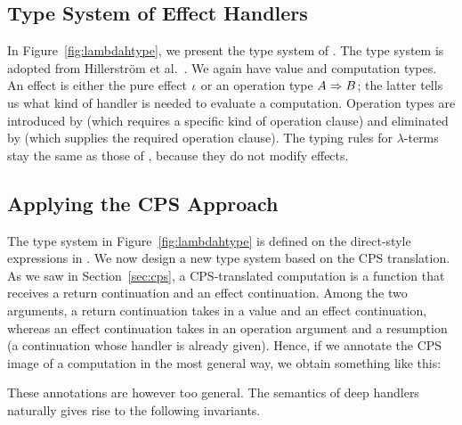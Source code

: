 \LambdaszType


\subsection{Type System of Effect Handlers}
\label{sec:type2:handler}

In Figure~\ref{fig:lambdahtype}, we present the type system of \lambdah.
The type system is adopted from Hillerstr\"om et al.~\cite{hillerstrom-cps}.
We again have value and computation types.
An effect is either the pure effect $\iota$ or an operation type
$A \Rightarrow B$; the latter tells us what kind of handler is needed to
evaluate a computation.
Operation types are introduced by  (which requires a specific
kind of operation clause) and eliminated by  (which supplies
the required operation clause).
The typing rules for $\lambda$-terms stay the same as those of \lambdasz,
because they do not modify effects.

\LambdahType


\subsection{Applying the CPS Approach}
\label{sec:type2:cps}

The type system in Figure~\ref{fig:lambdahtype} is defined on the 
direct-style expressions in \lambdah.
We now design a new type system based on the CPS translation.
As we saw in Section~\ref{sec:cps}, a CPS-translated \lambdah computation
is a function that receives a return continuation and an effect continuation.
Among the two arguments, a return continuation takes in a value and an 
effect continuation, whereas an effect continuation takes in an operation 
argument and a resumption (a continuation whose handler is already given).
Hence, if we annotate the CPS image of a computation in the most general
way, we obtain something like this:


\noindent These annotations are however too general.
The semantics of deep handlers naturally gives rise to the following
invariants.

